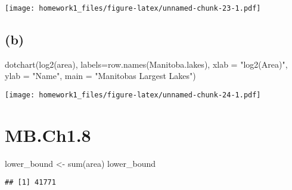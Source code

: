 \documentclass[
]{article}
\newenvironment{Shaded}{\begin{snugshade}}{\end{snugshade}}
\newcommand{\AttributeTok}[1]{\textcolor[rgb]{0.77,0.63,0.00}{#1}}
\newcommand{\FunctionTok}[1]{\textcolor[rgb]{0.00,0.00,0.00}{#1}}
\newcommand{\NormalTok}[1]{#1}
\newcommand{\OtherTok}[1]{\textcolor[rgb]{0.56,0.35,0.01}{#1}}
\newcommand{\StringTok}[1]{\textcolor[rgb]{0.31,0.60,0.02}{#1}}
\begin{document}
\texttt{[image: homework1\_files/figure-latex/unnamed-chunk-23-1.pdf]}

\hypertarget{b-4}{%
\subsection{(b)}\label{b-4}}

\begin{Shaded}
\begin{Highlighting}[]
\FunctionTok{dotchart}\NormalTok{(}\FunctionTok{log2}\NormalTok{(area), }\AttributeTok{labels=}\FunctionTok{row.names}\NormalTok{(Manitoba.lakes), }\AttributeTok{xlab =} \StringTok{"log2(Area)"}\NormalTok{, }\AttributeTok{ylab =} \StringTok{"Name"}\NormalTok{, }\AttributeTok{main =} \StringTok{"Manitoba\textquotesingle{}s Largest Lakes"}\NormalTok{)}
\end{Highlighting}
\end{Shaded}

\texttt{[image: homework1\_files/figure-latex/unnamed-chunk-24-1.pdf]}

\hypertarget{mb.ch1.8}{%
\section{MB.Ch1.8}\label{mb.ch1.8}}

\begin{Shaded}
\begin{Highlighting}[]
\NormalTok{lower\_bound }\OtherTok{\textless{}{-}} \FunctionTok{sum}\NormalTok{(area)}
\NormalTok{lower\_bound}
\end{Highlighting}
\end{Shaded}

\begin{verbatim}
## [1] 41771
\end{verbatim}
\end{document}
